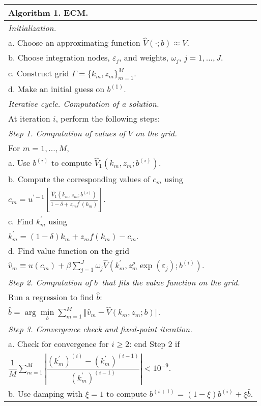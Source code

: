 {\small
\begin{tabular}{l}
\hline \hline
\textbf{Algorithm 1. ECM.} \\ \hline
\emph{Initialization.} \\
\quad a. Choose an approximating function $\widehat{V}(\cdot ;b)\approx V$.
\\
\quad b. Choose integration nodes, $\varepsilon _{j}$, and weights, $\omega
_{j}$, $j=1,...,J$. \\
\quad c. Construct grid $\Gamma =\{k_{m},z_{m}\}_{m=1}^{M}$. \\
\quad d. Make an initial guess on $b^{(1)}$. \\ \hline
\emph{Iterative cycle. Computation of a solution.} \\ \hline
\quad At iteration $i$, perform the following steps: \\
\emph{Step 1. Computation of values of }$V$ \emph{on the grid.} \\
\quad For $m=1,...,M,$ \\
\quad a. Use $b^{\left( i\right) }$ to compute $\widehat{V}_{1}\left(
k_{m},z_{m};b^{\left( i\right) }\right) $. \\
\quad b. Compute the corresponding values of $c_{m}$ using \\
\quad $c_{m}=u^{\prime -1}\left[ \frac{\widehat{V}_{1}\left(
k_{m},z_{m};b^{\left( i\right) }\right) }{1-\delta +z_{m}f^{\prime }\left(
k_{m}\right) }\right] .$ \\
\quad c. Find $k_{m}^{\prime }$ using \\
\quad $k_{m}^{\prime }=(1-\delta )k_{m}+z_{m}f\left( k_{m}\right) -c_{m}$.
\\
\quad d. Find value function on the grid \\
\quad $\widehat{v}_{m}\equiv u\left( c_{m}\right) +\beta
\sum_{j=1}^{J}\omega _{j}\widehat{V}\left( k_{m}^{\prime },z_{m}^{\rho }\exp
\left( \varepsilon _{j}\right) ;b^{(i)}\right) .$ \\ \hline
\emph{Step 2. Computation of }$b$\emph{\ that fits the value function on the
grid. } \\
\quad Run a regression to find $\widehat{b}:$ \\
\quad $\widehat{b}=\arg \underset{b}{\min }\sum_{m=1}^{M}\Vert \widehat{v}
_{m}-\widehat{V}(k_{m},z_{m};b)\Vert $. \\ \hline
\emph{Step 3. Convergence check and fixed-point iteration.} \\
\quad a. Check for convergence for $i\geq 2$: end Step 2 if \\
\quad $\dfrac{1}{M}\sum_{m=1}^{M}\left \vert \dfrac{(k_{m}^{\prime
})^{\left( i\right) }-(k_{m}^{\prime })^{\left( i-1\right) }}{(k_{m}^{\prime
})^{\left( i-1\right) }}\right \vert <10^{-9}.$ \\
\quad b. Use damping with $\xi =1$ to compute $b^{\left( i+1\right) }=(1-\xi
)b^{\left( i\right) }+\xi \widehat{b}$. \\ \hline \hline
\end{tabular}
}

